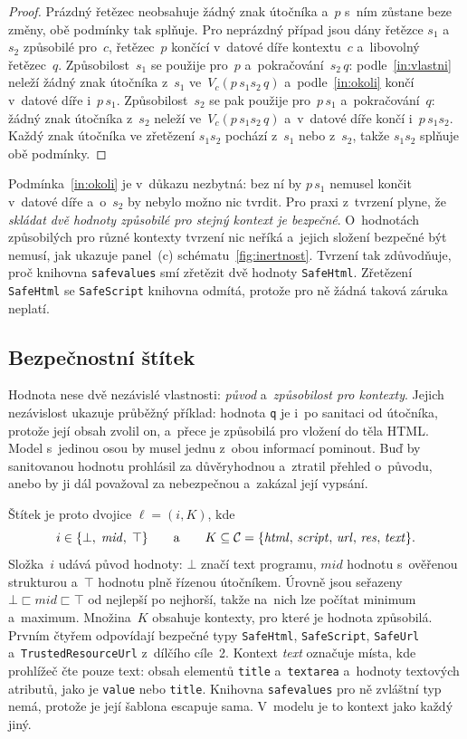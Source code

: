 \begin{proof}
Prázdný řetězec neobsahuje žádný znak útočníka a~$p$ s~ním zůstane beze změny, obě podmínky tak splňuje. Pro neprázdný případ jsou dány řetězce $s_1$ a~$s_2$ způsobilé pro~$c$, řetězec~$p$ končící v~datové díře kontextu~$c$ a~libovolný řetězec~$q$. Způsobilost~$s_1$ se použije pro~$p$ a~pokračování~$s_2\,q$: podle~\eqref{in:vlastni} neleží žádný znak útočníka z~$s_1$ ve~$V_c(p\,s_1 s_2\,q)$ a~podle~\eqref{in:okoli} končí v~datové díře i~$p\,s_1$. Způsobilost~$s_2$ se pak použije pro~$p\,s_1$ a~pokračování~$q$: žádný znak útočníka z~$s_2$ neleží ve~$V_c(p\,s_1 s_2\,q)$ a~v~datové díře končí i~$p\,s_1 s_2$. Každý znak útočníka ve zřetězení $s_1 s_2$ pochází z~$s_1$ nebo z~$s_2$, takže $s_1 s_2$ splňuje obě podmínky.
\end{proof}

Podmínka~\eqref{in:okoli} je v~důkazu nezbytná: bez ní by $p\,s_1$ nemusel končit v~datové díře a~o~$s_2$ by nebylo možno nic tvrdit. Pro praxi z~tvrzení plyne, že \emph{skládat dvě hodnoty způsobilé pro stejný kontext je bezpečné}. O~hodnotách způsobilých pro různé kontexty tvrzení nic neříká a~jejich složení bezpečné být nemusí, jak ukazuje panel~(c) schématu~\ref{fig:inertnost}. Tvrzení tak zdůvodňuje, proč knihovna \texttt{safevalues} smí zřetězit dvě hodnoty \texttt{SafeHtml}. Zřetězení \texttt{SafeHtml} se \texttt{SafeScript} knihovna odmítá, protože pro ně žádná taková záruka neplatí.

\subsection{Bezpečnostní štítek}
\label{sec:model-mrizka}

Hodnota nese dvě nezávislé vlastnosti: \emph{původ} a~\emph{způsobilost pro kontexty}. Jejich nezávislost ukazuje průběžný příklad: hodnota \texttt{q} je i~po sanitaci od útočníka, protože její obsah zvolil on, a~přece je způsobilá pro vložení do těla HTML. Model s~jedinou osou by musel jednu z~obou informací pominout. Buď by sanitovanou hodnotu prohlásil za důvěryhodnou a~ztratil přehled o~původu, anebo by ji dál považoval za nebezpečnou a~zakázal její vypsání.

Štítek je proto dvojice $\ell = (i, K)$, kde
\[
    i \in \{\bot,\; \mathit{mid},\; \top\}
    \qquad\text{a}\qquad
    K \subseteq \mathcal{C} = \{\mathit{html},\, \mathit{script},\, \mathit{url},\, \mathit{res},\, \mathit{text}\}.
\]
Složka~$i$ udává původ hodnoty: $\bot$ značí text programu, $\mathit{mid}$ hodnotu s~ověřenou strukturou a~$\top$ hodnotu plně řízenou útočníkem. Úrovně jsou seřazeny $\bot \sqsubset \mathit{mid} \sqsubset \top$ od nejlepší po nejhorší, takže na~nich lze počítat minimum a~maximum. Množina~$K$ obsahuje kontexty, pro které je hodnota způsobilá. Prvním čtyřem odpovídají bezpečné typy \texttt{SafeHtml}, \texttt{SafeScript}, \texttt{SafeUrl} a~\texttt{TrustedResourceUrl} z~dílčího cíle~2. Kontext \emph{text} označuje místa, kde prohlížeč čte pouze text: obsah elementů \texttt{title} a~\texttt{textarea} a~hodnoty textových atributů, jako je \texttt{value} nebo \texttt{title}. Knihovna \texttt{safevalues} pro ně zvláštní typ nemá, protože je její šablona escapuje sama. V~modelu je to kontext jako každý jiný.

